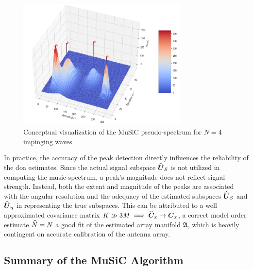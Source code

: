 \begin{figure}[H]
    \centering
    \includegraphics[width=0.76\textwidth]{figures/03_music/music_spectrum.png}
    \caption{Conceptual visualization of the MuSiC pseudo-spectrum for \( N = 4 \) impinging waves.}
    \label{fig:music_pseudospectrum}
\end{figure}

In practice, the accuracy of the peak detection directly influences the reliability of the \gls{doa} estimates.
Since the actual signal subspace \( \widehat{\boldsymbol{U}}_S \) is not utilized in computing the \gls{music}
spectrum, a peak's magnitude does not reflect signal strength. Instead, both the extent and magnitude of the peaks
are associated with the angular resolution and the adequacy of the estimated subspaces \( \widehat{\boldsymbol{U}}_S \) and \( \widehat{\boldsymbol{U}}_\eta \)
in representing the true subspaces. This can be attributed to a well approximated covariance matrix \(  K \gg 3M \implies \widehat{\boldsymbol{C}}_x \rightarrow \boldsymbol{C}_x \),
a correct model order estimate \( \widehat{N} = N \) a good fit of the estimated array manifold \( \mathfrak{A} \), which is heavily contingent on accurate calibration of the
antenna array.


\subsection{Summary of the MuSiC Algorithm}

